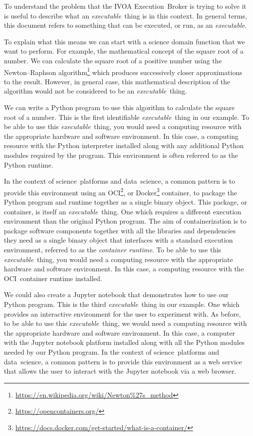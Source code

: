 \documentclass[11pt,a4paper]{ivoa}
\newcommand{\webservice} {web service}
\newcommand{\webbrowser} {web browser}
\newcommand{\ivoa} {IVOA}
\newcommand{\executionbroker} {Execution~Broker}
\newcommand{\jupyternotebook} {Jupyter notebook}
\newcommand{\python} {Python}
\newcommand{\pythonprogram} {Python program}
\newcommand{\ocicontainer} {OCI~container}
\newcommand{\footurl}[1] {\footnote{\url{#1}}}
\newcommand{\datascience} {data~science}
\newcommand{\scienceplatform} {science~platform}
\newcommand{\executable} {\textit{executable}}
\newcommand{\executablething} {\textit{executable}~thing}
\begin{document}
To understand the problem that the \ivoa{} \executionbroker{} is trying to solve
it is useful to describe what an \executablething{} is in this context.
In general terms, this document refers to something that can be executed, or run,
as an \executable{}.

To explain what this means we can start with a science domain function that we want to perform.
For example, the mathematical concept of the square root of a number.
We can calculate the square root of a positive number using the Newton–Raphson
algorithm\footurl{https://en.wikipedia.org/wiki/Newton\%27s_method}
which produces successively closer approximations to the result.
However, in general case, this mathematical description of the algorithm would not be
considered to be an \executablething{}.

We can write a \pythonprogram{} to use this algorithm to calculate the square root of a number.
This is the first identifiable \executablething{} in our example.
To be able to use this \executablething{}, you would need a computing resource with the appropriate
hardware and software environment. In this case, a computing resource with the \python{} interpreter
installed along with any additional \python{} modules required by the program.
This environment is often referred to as the \python{} runtime.

In the context of \scienceplatform{}s and \datascience{}, a common pattern is to provide this environment
using an OCI\footurl{https://opencontainers.org/},
or Docker\footurl{https://docs.docker.com/get-started/what-is-a-container/} container,
to package the \pythonprogram{} and runtime together as a single binary object.
This package, or container, is itself an \executablething{}. One which requires a different execution
environment than the original \pythonprogram{}.
The aim of containerization is to package software components together with all the libraries and dependencies
they need as a single binary object that interfaces with a standard execution environment,
referred to as the \textit{container runtime}.
To be able to use this \executablething{}, you would need a computing resource with the appropriate
hardware and software environment. In this case, a computing resource with the \ocicontainer{} runtime installed.

We could also create a \jupyternotebook{} that demonstrates how to use our \pythonprogram{}.
This is the third \executablething{} in our example.
One which provides an interactive environment for the user to experiment with.
As before, to be able to use this \executablething{}, we would need a computing resource with
the appropriate hardware and software environment.
In this case, a computer with the \jupyternotebook{} platform installed along with all the \python{} modules
needed by our \pythonprogram{}.
In the context of \scienceplatform{}s and \datascience{}, a common pattern is to provide this environment as a \webservice{}
that allows the user to interact with the \jupyternotebook{} via a \webbrowser.
\end{document}
